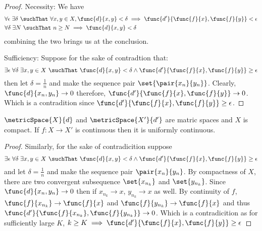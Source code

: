 \begin{proof}
    Necessity: We have
    \begin{align*}
         & \forall \epsilon \; \exists \delta \  \suchThat \ \forall x,y \in X, \func{d}{x,y} < \delta \implies \func{d'}{\func{f}{x}, \func{f}{y}} < \epsilon \\
         & \forall \delta \; \exists N \ \suchThat \ n \geq N \implies \func{d}{x,y} < \delta
    \end{align*}
    combining the two brings us at the conclusion.

    Sufficiency: Suppose for the sake of contradtion that:
    \begin{equation*}
        \exists \epsilon \; \forall \delta \; \exists x,y \in X  \ \suchThat \ \func{d}{x,y} < \delta \land \func{d'}{\func{f}{x}, \func{f}{y}} \geq \epsilon
    \end{equation*}
    then let \(\delta = \frac{1}{n}\) and make the sequence pair \(\set{\pair{x_n}{y_n}}\). Clearly, \(\func{d}{x_n,y_n} \to 0\) therefore, \(\func{d'}{\func{f}{x}, \func{f}{y}} \to 0\). Which is a contradition since \(\func{d'}{\func{f}{x}, \func{f}{y}} \geq \epsilon \).
\end{proof}

\begin{proposition}
    \(\metricSpace{X}{d}\) and \(\metricSpace{X'}{d'}\) are matric spaces and \(X\) is compact. If \(f: X \to X'\) is continuous then it is uniformly continuous.
\end{proposition}

\begin{proof}
    Similarly, for the sake of contradicition suppose
    \begin{equation*}
        \exists \epsilon \; \forall \delta \; \exists x,y \in X \ \suchThat \ \func{d}{x,y} < \delta \land \func{d'}{\func{f}{x}, \func{f}{y}} \geq \epsilon
    \end{equation*}
    and let \(\delta = \frac{1}{n}\) and make the sequence pair \(\pair{x_n}{y_n}\). By compactness of \(X\), there are two convergent subsequence \(\set{x_{n_k}}\) and \(\set{y_{n_k}}\). Since \(\func{d}{x_n,y_n} \to 0\) then if \(x_{n_k} \to x\), \(y_{n_k} \to x\) as well. By continuity of \(f\), \(\func{f}{x_{n_k}} \to \func{f}{x}\) and \(\func{f}{y_{n_k}} \to \func{f}{x}\) and thus \(\func{d'}{\func{f}{x_{n_k}}, \func{f}{y_{n_k}}} \to 0 \). Which is a contradicition as for sufficiently large \(K\), \(k \geq K \implies \func{d'}{\func{f}{x}, \func{f}{y}} \geq \epsilon\)
\end{proof}

